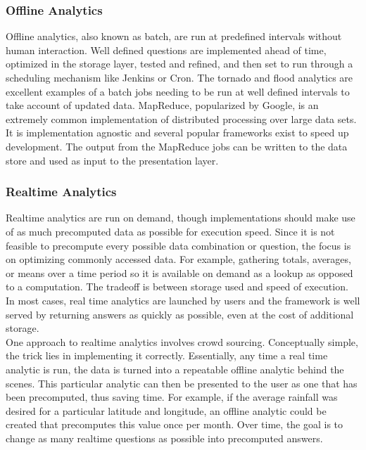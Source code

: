 \subsubsection{Offline Analytics}
Offline analytics, also known as batch, are run at predefined intervals without human interaction. Well defined questions are implemented ahead of time, optimized in the storage layer, tested and refined, and then set to run through a scheduling mechanism like Jenkins or Cron. The tornado and flood analytics are excellent examples of a batch jobs needing to be run at well defined intervals to take account of updated data. MapReduce, popularized by Google, is an extremely common implementation of distributed processing over large data sets. It is implementation agnostic and several popular frameworks exist to speed up development. The output from the MapReduce jobs can be written to the data store and used as input to the presentation layer.
\subsubsection{Realtime Analytics}
Realtime analytics are run on demand, though implementations should make use of as much precomputed data as possible for execution speed. Since it is not feasible to precompute every possible data combination or question, the focus is on optimizing commonly accessed data. For example, gathering totals, averages, or means over a time period so it is available on demand as a lookup as opposed to a computation. The tradeoff is between storage used and speed of execution. In most cases, real time analytics are launched by users and the framework is well served by returning answers as quickly as possible, even at the cost of additional storage.\\

One approach to realtime analytics involves crowd sourcing. Conceptually simple, the trick lies in implementing it correctly. Essentially, any time a real time analytic is run, the data is turned into a repeatable offline analytic behind the scenes. This particular analytic can then be presented to the user as one that has been precomputed, thus saving time. For example, if the average rainfall was desired for a particular latitude and longitude, an offline analytic could be created that precomputes this value once per month. Over time, the goal is to change as many realtime questions as possible into precomputed answers.
